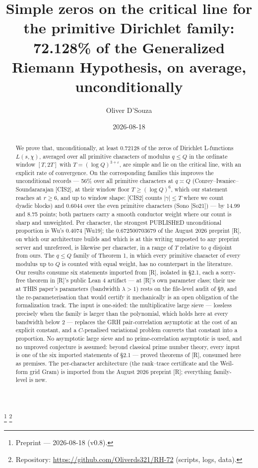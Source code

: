\documentclass[11pt]{amsart}
\theoremstyle{plain}
\theoremstyle{remark}
\begin{document}
\title[Simple zeros for the primitive Dirichlet family]{Simple
zeros on the critical line for the primitive Dirichlet family: 72.128\% of the
Generalized Riemann Hypothesis, on average, unconditionally}
\author{Oliver D'Souza}
\date{2026-08-18}
\thanks{Preprint --- 2026-08-18 (v0.8).}
\thanks{Repository: \url{https://github.com/Oliverds321/RH-72} (scripts, logs, data).}

\begin{abstract}
We prove that, unconditionally, at least 0.72128 of the zeros of Dirichlet
L-functions $L(s, \chi)$, averaged over all primitive characters of modulus $q \le Q$
in the ordinate window $[T, 2T]$ with $T = (\log Q)^{3+\varepsilon}$, are simple and lie
on the critical line, with an explicit rate of convergence. On the corresponding
families this improves the unconditional records --- 56\% over all primitive characters
at $q \asymp Q$ (Conrey--Iwaniec--Soundararajan [CIS2], at their window floor
$T \ge (\log Q)^{6}$, which our statement reaches at $r \ge 6$, and up to window shape:
[CIS2] counts $|\gamma| \le T$ where we count dyadic blocks) and 0.6044 over the even
primitive characters (Sono [So21]) --- by 14.99 and 8.75 points; both partners carry a
smooth conductor weight where our count is sharp and unweighted. Per character, the
strongest PUBLISHED unconditional proportion is Wu's 0.4074 [Wu19]; the 0.672500703679
of the August 2026 preprint [R], on which our architecture builds and which is at this
writing unposted to any preprint server and unrefereed, is likewise per character, in a
range of $T$ relative to $q$ disjoint from ours. The $q \le Q$ family of Theorem 1, in
which every primitive character of every modulus up to $Q$ is counted with equal weight,
has no counterpart in the literature. Our results consume six statements imported from
[R], isolated in \S2.1, each a sorry-free theorem in [R]'s public Lean 4 artifact ---
at [R]'s own parameter class; their use at THIS paper's parameters (bandwidth
$\lambda > 1$) rests on the file-level audit of \S9, and the re-parameterisation that
would certify it mechanically is an open obligation of the formalization track. The
input is one-sided: the multiplicative large sieve --- lossless precisely when the
family is larger than the polynomial, which holds here at every bandwidth below 2 ---
replaces the GRH pair-correlation asymptotic at the cost of an explicit constant, and a
$C$-penalised variational problem converts that constant into a proportion. No
asymptotic large sieve and no prime-correlation asymptotic is used, and no unproved
conjecture is assumed: beyond classical prime number theory, every input is one of the
six imported statements of \S2.1 --- proved theorems of [R], consumed here as premises.
The per-character architecture (the rank--trace certificate and the Weil-form grid
Gram) is imported from the August 2026 preprint [R]; everything family-level is new.
\end{abstract}
\end{document}
